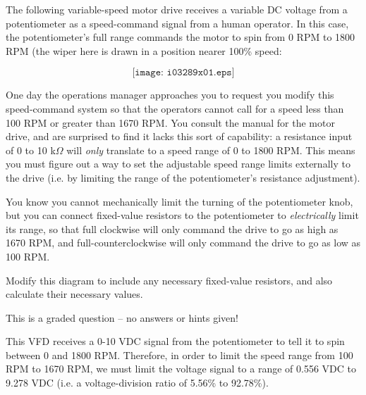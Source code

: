 

The following variable-speed motor drive receives a variable DC voltage from a potentiometer as a speed-command signal from a human operator.  In this case, the potentiometer's full range commands the motor to spin from 0 RPM to 1800 RPM (the wiper here is drawn in a position nearer 100\% speed:

$$\texttt{[image: i03289x01.eps]}$$

One day the operations manager approaches you to request you modify this speed-command system so that the operators cannot call for a speed less than 100 RPM or greater than 1670 RPM.  You consult the manual for the motor drive, and are surprised to find it lacks this sort of capability: a resistance input of 0 to 10 k$\Omega$ will {\it only} translate to a speed range of 0 to 1800 RPM.  This means you must figure out a way to set the adjustable speed range limits externally to the drive (i.e. by limiting the range of the potentiometer's resistance adjustment).

You know you cannot mechanically limit the turning of the potentiometer knob, but you can connect fixed-value resistors to the potentiometer to {\it electrically} limit its range, so that full clockwise will only command the drive to go as high as 1670 RPM, and full-counterclockwise will only command the drive to go as low as 100 RPM.

\vskip 10pt

Modify this diagram to include any necessary fixed-value resistors, and also calculate their necessary values.

\vfil 

\eject






This is a graded question -- no answers or hints given!







This VFD receives a 0-10 VDC signal from the potentiometer to tell it to spin between 0 and 1800 RPM.  Therefore, in order to limit the speed range from 100 RPM to 1670 RPM, we must limit the voltage signal to a range of 0.556 VDC to 9.278 VDC (i.e. a voltage-division ratio of 5.56\% to 92.78\%).

